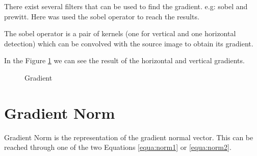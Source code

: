 \documentclass{article}
\begin{document}
There exist several filters that can be used to find the gradient. e.g: sobel and prewitt. Here was used the sobel operator to reach the results.

The sobel operator is a pair of kernels (one for vertical and one horizontal detection) which can be convolved with the source image to obtain its gradient.

In the Figure \ref{fig:gradient} we can see the result of the horizontal and vertical gradients.

	\begin{figure}[H]
	\centering
	\caption{Gradient}
	\label{fig:gradient}
	\end{figure}


\section{Gradient Norm}

Gradient Norm is the representation of the gradient normal vector. This can be reached through one of the two Equations \ref{equa:norm1} or \ref{equa:norm2}.
\end{document}
